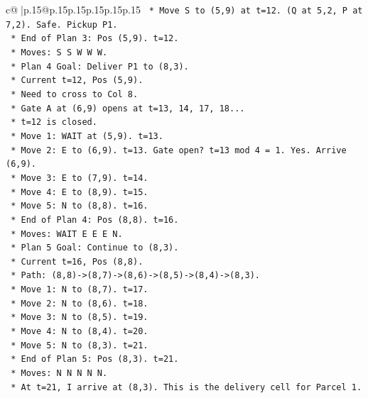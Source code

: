 \documentclass{article}
\begin{document}
{\begin{supertabular}{c@{$\;$}|p{.15\linewidth}@{}p{.15\linewidth}p{.15\linewidth}p{.15\linewidth}p{.15\linewidth}p{.15\linewidth}}
{{{\texttt{                *   Move S to (5,9) at t=12. (Q at 5,2, P at 7,2). Safe. Pickup P1.} \\
\texttt{                *   End of Plan 3: Pos (5,9). t=12.} \\
\texttt{                *   Moves: S S W W W.} \\
\texttt{            *   Plan 4 Goal: Deliver P1 to (8,3).} \\
\texttt{                *   Current t=12, Pos (5,9).} \\
\texttt{                *   Need to cross to Col 8.} \\
\texttt{                *   Gate A at (6,9) opens at t=13, 14, 17, 18...} \\
\texttt{                *   t=12 is closed.} \\
\texttt{                *   Move 1: WAIT at (5,9). t=13.} \\
\texttt{                *   Move 2: E to (6,9). t=13. Gate open? t=13 mod 4 = 1. Yes. Arrive (6,9).} \\
\texttt{                *   Move 3: E to (7,9). t=14.} \\
\texttt{                *   Move 4: E to (8,9). t=15.} \\
\texttt{                *   Move 5: N to (8,8). t=16.} \\
\texttt{                *   End of Plan 4: Pos (8,8). t=16.} \\
\texttt{                *   Moves: WAIT E E E N.} \\
\texttt{            *   Plan 5 Goal: Continue to (8,3).} \\
\texttt{                *   Current t=16, Pos (8,8).} \\
\texttt{                *   Path: (8,8){-}>(8,7){-}>(8,6){-}>(8,5){-}>(8,4){-}>(8,3).} \\
\texttt{                *   Move 1: N to (8,7). t=17.} \\
\texttt{                *   Move 2: N to (8,6). t=18.} \\
\texttt{                *   Move 3: N to (8,5). t=19.} \\
\texttt{                *   Move 4: N to (8,4). t=20.} \\
\texttt{                *   Move 5: N to (8,3). t=21.} \\
\texttt{                *   End of Plan 5: Pos (8,3). t=21.} \\
\texttt{                *   Moves: N N N N N.} \\
\texttt{                *   At t=21, I arrive at (8,3). This is the delivery cell for Parcel 1.} \\
}}}
\end{supertabular}}
\end{document}
